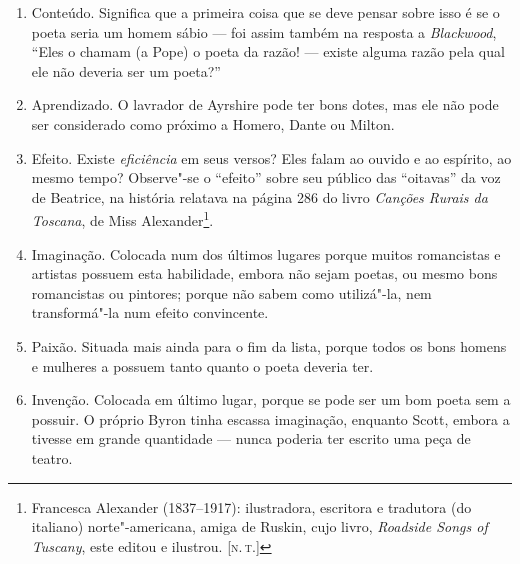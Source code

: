 \begin{enumerate}[label=(\scshape\alph*)]
\item Conteúdo. Significa que a primeira coisa que se deve pensar sobre
isso é se o poeta seria um homem sábio --- foi assim também na resposta a
\emph{Blackwood}, ``Eles o chamam (a Pope) o poeta da razão! --- existe
alguma razão pela qual ele não deveria ser um poeta?''

\item Aprendizado. O lavrador de Ayrshire pode ter bons dotes, mas ele
não pode ser considerado como próximo a Homero, Dante ou Milton.

\item Efeito. Existe \emph{eficiência} em seus versos? Eles falam ao
ouvido e ao espírito, ao mesmo tempo? Observe"-se o ``efeito'' sobre seu
público das ``oitavas'' da voz de Beatrice, na história relatava na
página 286 do livro \emph{Canções Rurais da Toscana}, de Miss
Alexander\footnote{Francesca Alexander (1837--1917): ilustradora,
  escritora e tradutora (do italiano) norte"-americana, amiga de Ruskin,
  cujo livro, \emph{Roadside Songs of Tuscany}, este editou e ilustrou.
  {[}\textsc{n.\,t.}{]}}.

\item Imaginação. Colocada num dos últimos lugares porque muitos
romancistas e artistas possuem esta habilidade, embora não sejam poetas,
ou mesmo bons romancistas ou pintores; porque não sabem como utilizá"-la,
nem transformá"-la num efeito convincente.

\item Paixão. Situada mais ainda para o fim da lista, porque todos os
bons homens e mulheres a possuem tanto quanto o poeta deveria ter.

\item Invenção. Colocada em último lugar, porque se pode ser um bom poeta
sem a possuir. O próprio Byron tinha escassa imaginação, enquanto Scott,
embora a tivesse em grande quantidade --- nunca poderia ter escrito uma
peça de teatro.
\end{enumerate}

